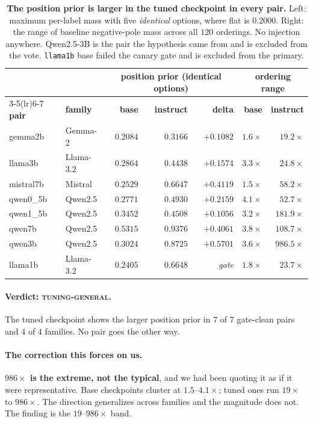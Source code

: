 \documentclass{article}
\begin{document}
\begin{table}[t]
\centering
\small
\caption{\textbf{The position prior is larger in the tuned checkpoint in every pair.} Left: maximum
per-label mass with five \emph{identical} options, where flat is $0.2000$. Right: the range of
baseline negative-pole mass across all $120$ orderings. No injection anywhere. Qwen2.5-3B is the pair
the hypothesis came from and is excluded from the vote. \texttt{llama1b} base failed the canary gate
and is excluded from the primary.}
\label{tab:families}
\begin{tabular}{@{}llrrrrr@{}}
\toprule
& & \multicolumn{3}{c}{\textbf{position prior (identical options)}} & \multicolumn{2}{c}{\textbf{ordering range}} \\
\cmidrule(lr){3-5}\cmidrule(lr){6-7}
\textbf{pair} & \textbf{family} & \textbf{base} & \textbf{instruct} & \textbf{delta} & \textbf{base} & \textbf{instruct} \\
\midrule
gemma2b   & Gemma-2   & $0.2084$ & $0.3166$ & $+0.1082$ & $1.6\times$ & $19.2\times$ \\
llama3b   & Llama-3.2 & $0.2864$ & $0.4438$ & $+0.1574$ & $3.3\times$ & $24.8\times$ \\
mistral7b & Mistral   & $0.2529$ & $0.6647$ & $+0.4119$ & $1.5\times$ & $58.2\times$ \\
qwen0\_5b & Qwen2.5   & $0.2771$ & $0.4930$ & $+0.2159$ & $4.1\times$ & $52.7\times$ \\
qwen1\_5b & Qwen2.5   & $0.3452$ & $0.4508$ & $+0.1056$ & $3.2\times$ & $181.9\times$ \\
qwen7b    & Qwen2.5   & $0.5315$ & $0.9376$ & $+0.4061$ & $3.8\times$ & $108.7\times$ \\
\midrule
qwen3b    & Qwen2.5   & $0.3024$ & $0.8725$ & $+0.5701$ & $3.6\times$ & $\mathbf{986.5\times}$ \\
llama1b   & Llama-3.2 & $0.2405$ & $0.6648$ & \emph{gate} & $1.8\times$ & $23.7\times$ \\
\bottomrule
\end{tabular}
\end{table}

\paragraph{Verdict: \textsc{tuning-general}.} The tuned checkpoint shows the larger position prior
in $7$ of $7$ gate-clean pairs and $4$ of $4$ families. No pair goes the other way.

\paragraph{The correction this forces on us.} \textbf{$986\times$ is the extreme, not the typical},
and we had been quoting it as if it were representative. Base checkpoints cluster at
$1.5$--$4.1\times$; tuned ones run $19\times$ to $986\times$. The direction generalizes across
families and the magnitude does not. The finding is the $19$--$986\times$ band.
\end{document}
